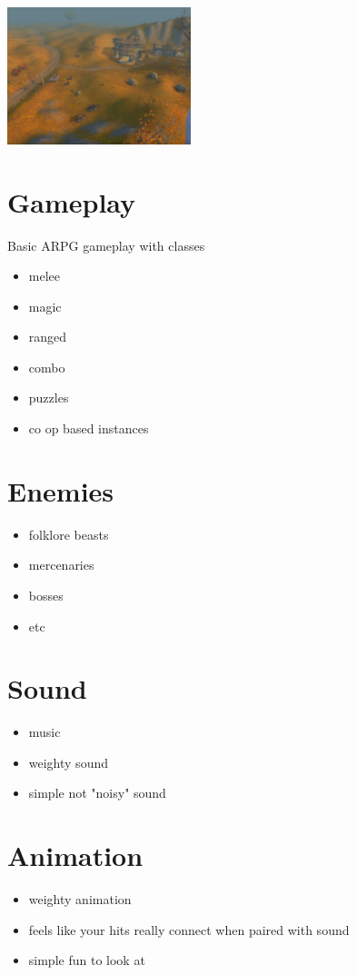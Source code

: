 \documentclass{article}
\begin{document}
\\
\includegraphics[width=0.4\textwidth]{westfall.jpg}

\section*{Gameplay}
Basic ARPG gameplay with classes
\begin{itemize}
  \item melee
  \item magic
  \item ranged
  \item combo
  \item puzzles
  \item co op based instances
\end{itemize}
\section*{Enemies}
\begin{itemize}
  \item folklore beasts
  \item mercenaries
  \item bosses
  \item etc
\end{itemize}
\section*{Sound}
\begin{itemize}
  \item music
  \item weighty sound
  \item simple not "noisy" sound
\end{itemize}
\section*{Animation}
\begin{itemize}
  \item weighty animation
  \item feels like your hits really connect when paired with sound
  \item simple fun to look at
\end{itemize}
\end{document}
